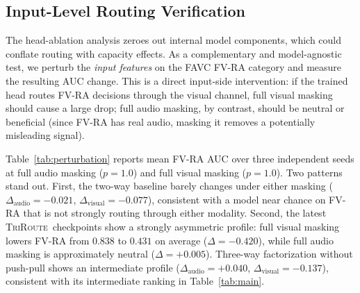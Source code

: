 \documentclass{article}
\newcommand{\method}{\textsc{TriRoute}}
\begin{document}

\subsection{Input-Level Routing Verification}

The head-ablation analysis zeroes out internal model components, which could conflate routing with capacity effects. As a complementary and model-agnostic test, we perturb the \emph{input features} on the FAVC FV-RA category and measure the resulting AUC change. This is a direct input-side intervention: if the trained head routes FV-RA decisions through the visual channel, full visual masking should cause a large drop; full audio masking, by contrast, should be neutral or beneficial (since FV-RA has real audio, masking it removes a potentially misleading signal).

Table~\ref{tab:perturbation} reports mean FV-RA AUC over three independent seeds at full audio masking ($p=1.0$) and full visual masking ($p=1.0$). Two patterns stand out. First, the two-way baseline barely changes under either masking ($\Delta_{\mathrm{audio}}=-0.021$, $\Delta_{\mathrm{visual}}=-0.077$), consistent with a model near chance on FV-RA that is not strongly routing through either modality. Second, the latest \method\ checkpoints show a strongly asymmetric profile: full visual masking lowers FV-RA from $0.838$ to $0.431$ on average ($\Delta=-0.420$), while full audio masking is approximately neutral ($\Delta=+0.005$). Three-way factorization without push-pull shows an intermediate profile ($\Delta_{\mathrm{audio}}=+0.040$, $\Delta_{\mathrm{visual}}=-0.137$), consistent with its intermediate ranking in Table~\ref{tab:main}.
\end{document}
